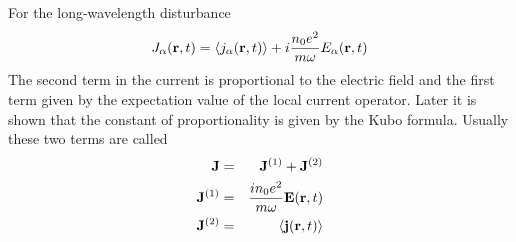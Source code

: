 For the long-wavelength disturbance
\begin{equation}
    J_\alpha (\mathbf{r},t) = \langle j_\alpha (\mathbf{r},t) \rangle + i \frac{n_0 e^2}{m\omega} E_\alpha(\mathbf{r},t) \label{3.363}
\end{equation}
The second term in the current is proportional to the electric field and the first term given by the expectation value of the local current operator.
Later it is shown that the constant of proportionality is given by the Kubo formula.
Usually these two terms are called
\begin{eqnarray}
    \mathbf{J} &=& \mathbf{J}^{(1)} + \mathbf{J}^{(2)}    \label{3.364} \\
    \mathbf{J}^{(1)} &=& \frac{in_0 e^2}{m\omega} \mathbf{E}( \mathbf{r},t)    \label{3.365} \\
    \mathbf{J}^{(2)} &=& \langle \mathbf{j}(\mathbf{r},t) \rangle  \label{3.366}
\end{eqnarray}

